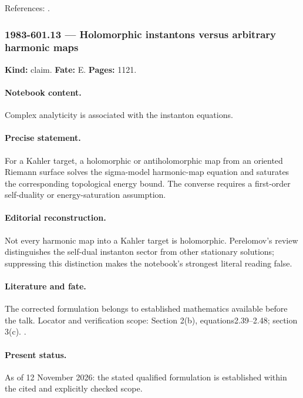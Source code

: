 \noindent References: \citep{perelomov1981instantons}.\par

\subsubsection{1983-601.13 --- Holomorphic instantons versus arbitrary harmonic maps}

\label{item:1983-601.13}

\noindent\textbf{Kind:} claim. \textbf{Fate:} E. \textbf{Pages:} 1121.\par

\paragraph{Notebook content.} Complex analyticity is associated with the instanton equations.

\paragraph{Precise statement.} For a Kahler target, a holomorphic or antiholomorphic map from an oriented Riemann surface solves the sigma-model harmonic-map equation and saturates the corresponding topological energy bound. The converse requires a first-order self-duality or energy-saturation assumption.

\paragraph{Editorial reconstruction.} Not every harmonic map into a Kahler target is holomorphic. Perelomov's review distinguishes the self-dual instanton sector from other stationary solutions; suppressing this distinction makes the notebook's strongest literal reading false.

\paragraph{Literature and fate.} The corrected formulation belongs to established mathematics available before the talk. Locator and verification scope: Section 2(b), equations2.39--2.48; section 3(c). \cite{perelomov1981instantons}.

\paragraph{Present status.} As of 12 November 2026: the stated qualified formulation is established within the cited and explicitly checked scope.

